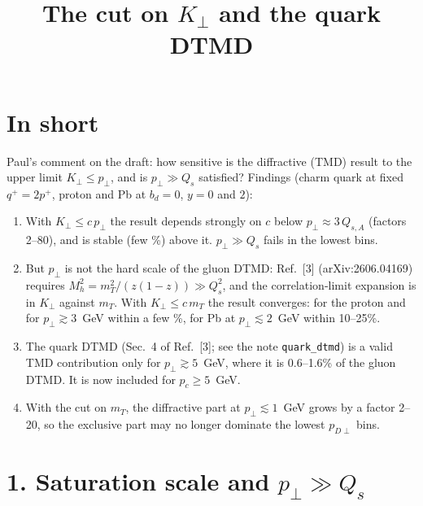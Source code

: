 \documentclass[12pt]{article}
\title{The cut on $K_\perp$ and the quark DTMD}
\author{}
\date{}
\begin{document}
\maketitle

\section*{In short}

Paul's comment on the draft: how sensitive is the diffractive (TMD) result to the upper limit
$K_\perp\leq p_\perp$, and is $p_\perp\gg Q_s$ satisfied? Findings (charm quark at fixed $q^+=2p^+$,
proton and Pb at $b_d=0$, $y=0$ and $2$):
\begin{enumerate}
\item With $K_\perp\leq c\,p_\perp$ the result depends strongly on $c$ below $p_\perp\approx3\,Q_{s,A}$
  (factors 2--80), and is stable (few \%) above it. $p_\perp\gg Q_s$ fails in the lowest bins.
\item But $p_\perp$ is not the hard scale of the gluon DTMD: Ref.~[3] (arXiv:2606.04169) requires
  $M_h^2=m_T^2/(z(1-z))\gg Q_s^2$, and the correlation-limit expansion is in $K_\perp$ against $m_T$.
  With $K_\perp\leq c\,m_T$ the result converges: for the proton and for $p_\perp\gtrsim3$~GeV within
  a few \%, for Pb at $p_\perp\lesssim2$~GeV within 10--25\%.
\item The quark DTMD (Sec.~4 of Ref.~[3]; see the note \texttt{quark\_dtmd}) is a valid TMD contribution
  only for $p_\perp\gtrsim5$~GeV, where it is 0.6--1.6\% of the gluon DTMD. It is now included for
  $p_c\geq5$~GeV.
\item With the cut on $m_T$, the diffractive part at $p_\perp\lesssim1$~GeV grows by a factor 2--20,
  so the exclusive part may no longer dominate the lowest $p_{D\perp}$ bins.
\end{enumerate}

\section*{1. Saturation scale and $p_\perp\gg Q_s$}
\end{document}
